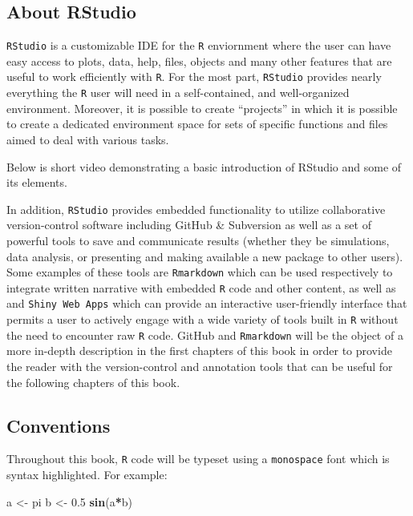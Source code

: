 \documentclass[12pt,]{krantz}
\newenvironment{Shaded}{\begin{snugshade}}{\end{snugshade}}
\newcommand{\KeywordTok}[1]{\textcolor[rgb]{0.27,0.27,0.27}{\textbf{#1}}}
\newcommand{\FloatTok}[1]{\textcolor[rgb]{0.06,0.06,0.06}{#1}}
\newcommand{\StringTok}[1]{\textcolor[rgb]{0.5,0.5,0.5}{#1}}
\newcommand{\OperatorTok}[1]{\textcolor[rgb]{0.43,0.43,0.43}{\textbf{#1}}}
\newcommand{\NormalTok}[1]{#1}
\begin{document}
\subsection{About RStudio}\label{about-rstudio}

\texttt{RStudio} is a customizable IDE for the \texttt{R} enviornment
where the user can have easy access to plots, data, help, files, objects
and many other features that are useful to work efficiently with
\texttt{R}. For the most part, \texttt{RStudio} provides nearly
everything the \texttt{R} user will need in a self-contained, and
well-organized environment. Moreover, it is possible to create
``projects'' in which it is possible to create a dedicated environment
space for sets of specific functions and files aimed to deal with
various tasks.

Below is short video demonstrating a basic introduction of RStudio and
some of its elements.

In addition, \texttt{RStudio} provides embedded functionality to utilize
collaborative version-control software including GitHub \& Subversion as
well as a set of powerful tools to save and communicate results (whether
they be simulations, data analysis, or presenting and making available a
new package to other users). Some examples of these tools are
\texttt{Rmarkdown} which can be used respectively to integrate written
narrative with embedded \texttt{R} code and other content, as well as
and \texttt{Shiny\ Web\ Apps} which can provide an interactive
user-friendly interface that permits a user to actively engage with a
wide variety of tools built in \texttt{R} without the need to encounter
raw \texttt{R} code. GitHub and \texttt{Rmarkdown} will be the object of
a more in-depth description in the first chapters of this book in order
to provide the reader with the version-control and annotation tools that
can be useful for the following chapters of this book.

\subsection{Conventions}\label{conventions}

Throughout this book, \texttt{R} code will be typeset using a
\texttt{monospace} font which is syntax highlighted. For example:

\begin{Shaded}
\begin{Highlighting}[]
\NormalTok{a <-}\StringTok{ }\NormalTok{pi}
\NormalTok{b <-}\StringTok{ }\FloatTok{0.5}
\KeywordTok{sin}\NormalTok{(a}\OperatorTok{*}\NormalTok{b)}
\end{Highlighting}
\end{Shaded}
\end{document}
